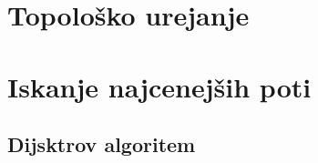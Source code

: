 \documentclass[10pt,a4paper,oneside]{book}
\begin{document}


\section{Topološko urejanje}

\section{Iskanje najcenejših poti}
\subsection{Dijsktrov algoritem}

\end{document}
